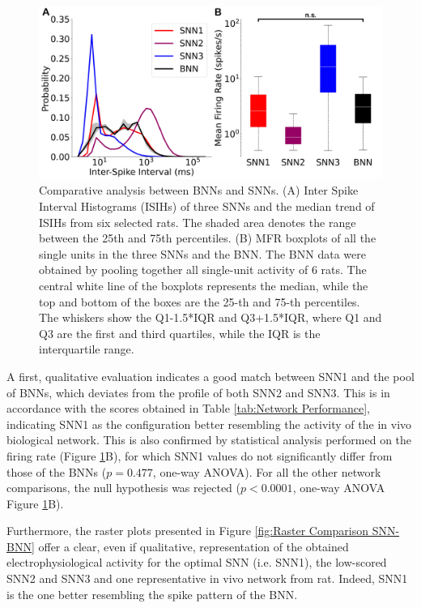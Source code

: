 \begin{figure}[ht!]
    \begin{center}
    \includegraphics[width=\linewidth]{Figure/Histo-Box Comparison SNN-BNN.jpg}
    \end{center}
    \caption{Comparative analysis between BNNs and SNNs. (A) Inter Spike Interval Histograms (ISIHs) of three SNNs and the median trend of ISIHs from six selected rats. The shaded area denotes the range between the 25th and 75th percentiles. (B) MFR boxplots of all the single units in the three SNNs and the BNN. The BNN data were obtained by pooling together all single-unit activity of 6 rats. The central white line of the boxplots represents the median, while the top and bottom of the boxes are the 25-th and 75-th percentiles. The whiskers show the Q1-1.5*IQR and Q3+1.5*IQR, where Q1 and Q3 are the first and third quartiles, while the IQR is the interquartile range.}
    \label{fig:Histo-Box Comparison SNN-BNN}
\end{figure}

A first, qualitative evaluation indicates a good match between SNN1 and the pool of BNNs, which deviates from the profile of both SNN2 and SNN3. This is in accordance with the scores obtained in Table \ref{tab:Network Performance}, indicating SNN1 as the configuration better resembling the activity of the in vivo biological network. This is also confirmed by statistical analysis performed on the firing rate (Figure \ref{fig:Histo-Box Comparison SNN-BNN}B), for which SNN1 values do not significantly differ from those of the BNNs ($p= 0.477$, one-way ANOVA). For all the other network comparisons, the null hypothesis was rejected ($p<0.0001$, one-way ANOVA Figure \ref{fig:Histo-Box Comparison SNN-BNN}B). 

Furthermore, the raster plots presented in Figure \ref{fig:Raster Comparison SNN-BNN} offer a clear, even if qualitative, representation of the obtained electrophysiological activity for the optimal SNN (i.e. SNN1), the low-scored SNN2 and SNN3 and one representative in vivo network from rat. Indeed, SNN1 is the one better resembling the spike pattern of the BNN.

